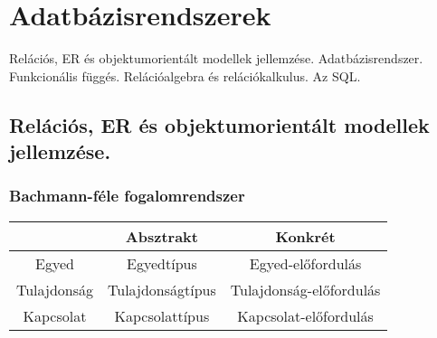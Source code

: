 \section{Adatbázisrendszerek}
{\footnotesize Relációs, ER és objektumorientált modellek jellemzése. Adatbázisrendszer. Funkcionális függés. Relációalgebra és relációkalkulus. Az SQL.}
\subsection{Relációs, ER és objektumorientált modellek jellemzése.}
\subsubsection{Bachmann-féle fogalomrendszer}
\begin{tabular}{|c|c|c|}
	\hline 
	& Absztrakt & Konkrét \\ 
	\hline 
	Egyed & Egyedtípus & Egyed-előfordulás \\ 
	\hline 
	Tulajdonság & Tulajdonságtípus & Tulajdonság-előfordulás \\ 
	\hline 
	Kapcsolat & Kapcsolattípus & Kapcsolat-előfordulás \\ 
	\hline 
\end{tabular} 
